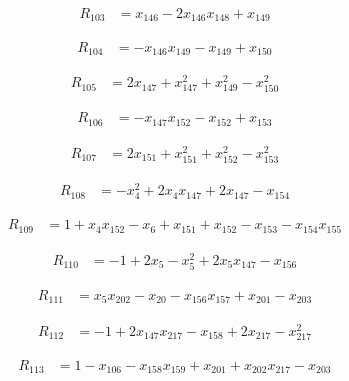 \begin{align*}
R_{103} &= x_{146} -2 x_{146} x_{148} +x_{149}
\end{align*}

\begin{align*}
R_{104} &= -x_{146} x_{149} -x_{149} +x_{150}
\end{align*}

\begin{align*}
R_{105} &= 2 x_{147} +x_{147}^{2} +x_{149}^{2} -x_{150}^{2}
\end{align*}

\begin{align*}
R_{106} &= -x_{147} x_{152} -x_{152} +x_{153}
\end{align*}

\begin{align*}
R_{107} &= 2 x_{151} +x_{151}^{2} +x_{152}^{2} -x_{153}^{2}
\end{align*}

\begin{align*}
R_{108} &= -x_{4}^{2} +2 x_{4} x_{147} +2 x_{147} -x_{154}
\end{align*}

\begin{align*}
R_{109} &= 1 +x_{4} x_{152} -x_{6} +x_{151} +x_{152} -x_{153} -x_{154} x_{155}
\end{align*}

\begin{align*}
R_{110} &= -1 +2 x_{5} -x_{5}^{2} +2 x_{5} x_{147} -x_{156}
\end{align*}

\begin{align*}
R_{111} &= x_{5} x_{202} -x_{20} -x_{156} x_{157} +x_{201} -x_{203}
\end{align*}

\begin{align*}
R_{112} &= -1 +2 x_{147} x_{217} -x_{158} +2 x_{217} -x_{217}^{2}
\end{align*}

\begin{align*}
R_{113} &= 1 -x_{106} -x_{158} x_{159} +x_{201} +x_{202} x_{217} -x_{203}
\end{align*}

